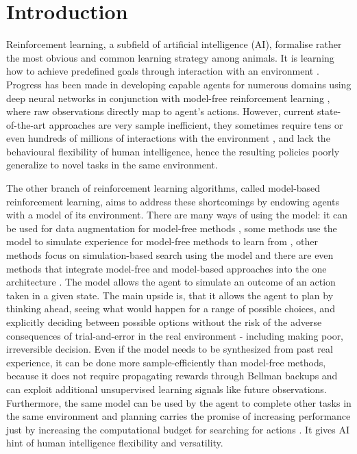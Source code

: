 \section{Introduction}

Reinforcement learning, a subfield of artificial intelligence (AI), formalise rather the most obvious and common learning strategy among animals. It is learning how to achieve predefined goals through interaction with an environment \cite{Book.RLAI}. Progress has been made in developing capable agents for numerous domains using deep neural networks in conjunction with model-free reinforcement learning \cite{Algo.Rainbow}\cite{Algo.A3C}\cite{Algo.PPO}, where raw observations directly map to agent's actions. However, current state-of-the-art approaches are very sample inefficient, they sometimes require tens or even hundreds of millions of interactions with the environment \cite{Benchmark.RevisitingALE}, and lack the behavioural flexibility of human intelligence, hence the resulting policies poorly generalize to novel tasks in the same environment.

The other branch of reinforcement learning algorithms, called model-based reinforcement learning, aims to address these shortcomings by endowing agents with a model of its environment. There are many ways of using the model: it can be used for data augmentation for model-free methods \cite{Algo.MBVE}, some methods use the model to simulate experience for model-free methods to learn from \cite{Algo.WorldModels}, other methods focus on simulation-based search using the model \cite{Algo.AlphaZero} and there are even methods that integrate model-free and model-based approaches into the one architecture \cite{Algo.I2A}. The model allows the agent to simulate an outcome of an action taken in a given state. The main upside is, that it allows the agent to plan by thinking ahead, seeing what would happen for a range of possible choices, and explicitly deciding between possible options without the risk of the adverse consequences of trial-and-error in the real environment - including making poor, irreversible decision. Even if the model needs to be synthesized from past real experience, it can be done more sample-efficiently than model-free methods, because it does not require propagating rewards through Bellman backups and can exploit additional unsupervised learning signals like future observations. Furthermore, the same model can be used by the agent to complete other tasks in the same environment \cite{Algo.I2A} and planning carries the promise of increasing performance just by increasing the computational budget for searching for actions \cite{Algo.AlphaGoZero}. It gives AI hint of human intelligence flexibility and versatility.

